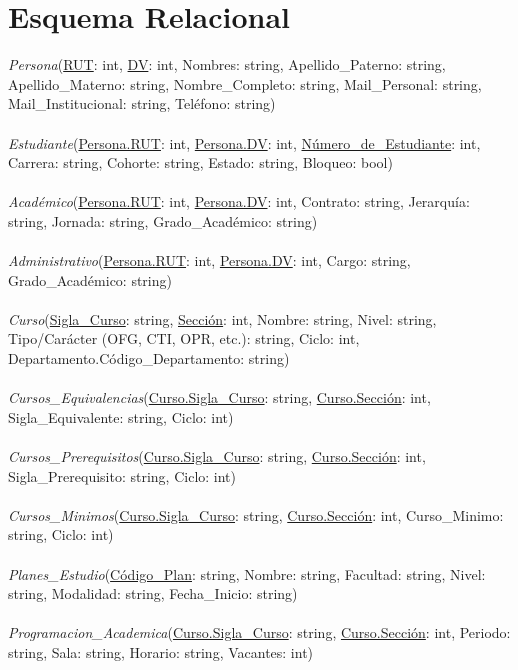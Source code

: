 \documentclass[12pt]{article}
\begin{document}
\section*{Esquema Relacional}
\textit{Persona}(\underline{RUT}: int, \underline{DV}: int, Nombres: string, Apellido\_Paterno: string, Apellido\_Materno: string, Nombre\_Completo: string, Mail\_Personal: string, Mail\_Institucional: string, Teléfono: string) \\\\
\textit{Estudiante}(\underline{Persona.RUT}: int, \underline{Persona.DV}: int, \underline{Número\_de\_Estudiante}: int, Carrera: string, Cohorte: string, Estado: string, Bloqueo: bool) \\\\
\textit{Académico}(\underline{Persona.RUT}: int, \underline{Persona.DV}: int, Contrato: string, Jerarquía: string, Jornada: string, Grado\_Académico: string) \\\\
\textit{Administrativo}(\underline{Persona.RUT}: int, \underline{Persona.DV}: int, Cargo: string, Grado\_Académico: string) \\\\
\textit{Curso}(\underline{Sigla\_Curso}: string, \underline{Sección}: int, Nombre: string, Nivel: string, Tipo/Carácter (OFG, CTI, OPR, etc.): string, Ciclo: int, Departamento.Código\_Departamento: string) \\\\
\textit{Cursos\_Equivalencias}(\underline{Curso.Sigla\_Curso}: string, \underline{Curso.Sección}: int, Sigla\_Equivalente: string, Ciclo: int) \\\\
\textit{Cursos\_Prerequisitos}(\underline{Curso.Sigla\_Curso}: string, \underline{Curso.Sección}: int, Sigla\_Prerequisito: string, Ciclo: int) \\\\
\textit{Cursos\_Minimos}(\underline{Curso.Sigla\_Curso}: string, \underline{Curso.Sección}: int, Curso\_Minimo: string, Ciclo: int) \\\\
\textit{Planes\_Estudio}(\underline{Código\_Plan}: string, Nombre: string, Facultad: string, Nivel: string, Modalidad: string, Fecha\_Inicio: string) \\\\
\textit{Programacion\_Academica}(\underline{Curso.Sigla\_Curso}: string, \underline{Curso.Sección}: int, Periodo: string, Sala: string, Horario: string, Vacantes: int) \\\\
\end{document}
